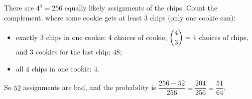 There are $4^4=256$ equally likely assignments of the chips. Count the complement, where some cookie gets at least $3$ chips (only one cookie can):
\begin{itemize}
\item exactly $3$ chips in one cookie: $4$ choices of cookie, $\dbinom43=4$ choices of chips, and $3$ cookies for the last chip: $48$;
\item all $4$ chips in one cookie: $4$.
\end{itemize}
So $52$ assignments are bad, and the probability is $\dfrac{256-52}{256}=\dfrac{204}{256}=\boxed{\dfrac{51}{64}}$.
